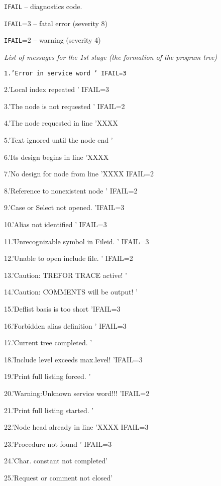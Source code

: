\smallskip

 {\tt IFAIL} -- diagnostics code.

  {\tt IFAIL}=3  -- fatal error (severity 8)

   {\tt IFAIL}=2  -- warning (severity 4)

{\it List of messages for the
   1st stage (the formation of the program tree)}

  {\tt  1.'Error in service word  \qquad  ' \qquad      IFAIL=3

    2.'Local index repeated  \qquad      '  \qquad     IFAIL=3

    3.'The node  is not requested \qquad  ' \qquad      IFAIL=2

    4.'The node requested in line \qquad   'XXXX

    5.'Text ignored until the node end  \qquad   '

    6.'Its  design begins in line  \qquad   'XXXX

    7.'No design for node from line \qquad  'XXXX \quad  IFAIL=2

    8.'Reference to nonexistent node \qquad ' \qquad   IFAIL=2

    9.'Case or Select not opened.  \qquad   '\qquad   IFAIL=3

   10.'Alias not identified   \qquad      '  \qquad      IFAIL=3

   11.'Unrecognizable symbol in Fileid. \quad '  \qquad       IFAIL=3

   12.'Unable to open include file. \qquad  ' \qquad       IFAIL=2

   13.'Caution: TREFOR TRACE active! \qquad        '

   14.'Caution: COMMENTS will be output! \quad  '

   15.'Deflist basis is too short \qquad   '\qquad        IFAIL=3

   16.'Forbidden alias definition \qquad  ' \qquad       IFAIL=3

   17.'Current tree completed.   \qquad      '

   18.'Include level exceeds max.level! \quad   '\qquad   IFAIL=3

   19.'Print full listing forced. \qquad  '

   20.'Warning:Unknown service word!!! \quad '\qquad   IFAIL=2

   21.'Print full listing started. \qquad  '

   22.'Node head already in line \qquad  'XXXX \quad  IFAIL=3

   23.'Procedure not found \qquad       ' \qquad   IFAIL=3

   24.'Char. constant not completed'

   25.'Request or comment not closed'}

